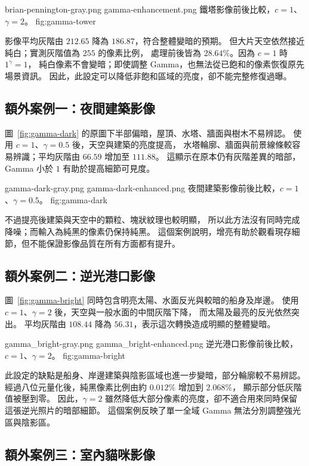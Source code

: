\GammaComparison
  {brian-pennington-gray.png}
  {gamma-enhancement.png}
  {鐵塔影像前後比較，$c=1$、$\gamma=2$。}
  {fig:gamma-tower}

影像平均灰階由 $212.65$ 降為 $186.87$，符合整體變暗的預期。
但大片天空依然接近純白；實測灰階值為 $255$ 的像素比例，
處理前後皆為 $28.64\%$。因為 $c=1$ 時 $1^{\gamma}=1$，
純白像素不會變暗；即使調整 Gamma，也無法從已飽和的像素恢復原先場景資訊。
因此，此設定可以降低非飽和區域的亮度，卻不能完整修復過曝。

\subsection{額外案例一：夜間建築影像}

圖~\ref{fig:gamma-dark} 的原圖下半部偏暗，屋頂、水塔、牆面與樹木不易辨認。
使用 $c=1$、$\gamma=0.5$ 後，天空與建築的亮度提高，
水塔輪廓、牆面與前景線條較容易辨識；平均灰階由 $66.59$ 增加至 $111.88$。
這顯示在原本仍有灰階差異的暗部，Gamma 小於 $1$ 有助於提高細節可見度。

\GammaComparison
  {gamma-dark-gray.png}
  {gamma-dark-enhanced.png}
  {夜間建築影像前後比較，$c=1$、$\gamma=0.5$。}
  {fig:gamma-dark}

不過提亮後建築與天空中的顆粒、塊狀紋理也較明顯，
所以此方法沒有同時完成降噪；而輸入為純黑的像素仍保持純黑。
這個案例說明，增亮有助於觀看現存細節，但不能保證影像品質在所有方面都有提升。

\subsection{額外案例二：逆光港口影像}

圖~\ref{fig:gamma-bright} 同時包含明亮太陽、水面反光與較暗的船身及岸邊。
使用 $c=1$、$\gamma=2$ 後，天空與一般水面的中間灰階下降，
而太陽及最亮的反光依然突出。
平均灰階由 $108.44$ 降為 $56.31$，表示這次轉換造成明顯的整體變暗。

\GammaComparison
  {gamma_bright-gray.png}
  {gamma_bright-enhanced.png}
  {逆光港口影像前後比較，$c=1$、$\gamma=2$。}
  {fig:gamma-bright}

此設定的缺點是船身、岸邊建築與陰影區域也進一步變暗，部分輪廓較不易辨認。
經過八位元量化後，純黑像素比例由約 $0.012\%$ 增加到 $2.068\%$，
顯示部分低灰階值被壓到零。
因此，$\gamma=2$ 雖然降低大部分像素的亮度，卻不適合用來同時保留這張逆光照片的暗部細節。
這個案例反映了單一全域 Gamma 無法分別調整強光區與陰影區。

\subsection{額外案例三：室內貓咪影像}

